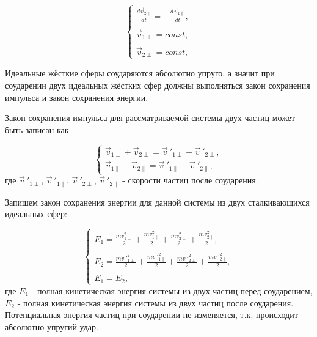 \documentclass[a4paper]{article}
\begin{document}
\begin{equation}\label{eq:velocities_and_forces_for_two_particles2}
    \begin{cases}
        \displaystyle\frac{d\vec{v}_{2\parallel}}{dt} = -\displaystyle\frac{d\vec{v}_{1\parallel}}{dt},
        \\
        \\
        \vec{v}_{1\perp} = const,
        \\
        \\
        \vec{v}_{2\perp} = const,
    \end{cases}
\end{equation}

Идеальные жёсткие сферы соударяются абсолютно упруго, а значит при соударении двух идеальных жёстких сфер должны выполняться закон сохранения импульса и закон сохранения энергии.

Закон сохранения импульса для рассматриваемой системы двух частиц  может быть записан как

\begin{equation}\label{eq:rule_of_contant_impulse}
    \begin{cases}
        \vec{v}_{1\perp} + \vec{v}_{2\perp} = \vec{v}\ '_{1\perp} + \vec{v}\ '_{2\perp},
        \\
        \vec{v}_{1\parallel} + \vec{v}_{2\parallel} = \vec{v}\ '_{1\parallel} + \vec{v}\ '_{2\parallel},
    \end{cases}
\end{equation}
где $ \vec{v}\ '_{1\perp} $, $ \vec{v}\ '_{1\parallel} $, $ \vec{v}\ '_{2\perp} $, $ \vec{v}\ '_{2\parallel} $ - скорости частиц после соударения.

Запишем закон сохранения энергии для данной системы из двух сталкивающихся идеальных сфер:

\begin{equation}\label{eq:rule_of_contant_energy}
    \begin{cases}
        E_1 = \displaystyle\frac{mv^2_{1\perp}}{2} + \displaystyle\frac{mv^2_{1\parallel}}{2} + \displaystyle\frac{mv^2_{2\perp}}{2} + \displaystyle\frac{mv^2_{2\parallel}}{2},
        \\
        \\
        E_2 = \displaystyle\frac{mv\ '^2_{1\perp}}{2} + \displaystyle\frac{mv\ '^2_{1\parallel}}{2} + \displaystyle\frac{mv\ '^2_{2\perp}}{2} + \displaystyle\frac{mv\ '^2_{2\parallel}}{2},
        \\
        \\
        E_1 = E_2,
    \end{cases}
\end{equation}
где $ E_1 $ - полная кинетическая энергия системы из двух частиц перед соударением, $ E_2 $ - полная кинетическая энергия системы из двух частиц после соударения. Потенциальная энергия частиц при соударении не изменяется, т.к. происходит абсолютно упругий удар.
\end{document}
